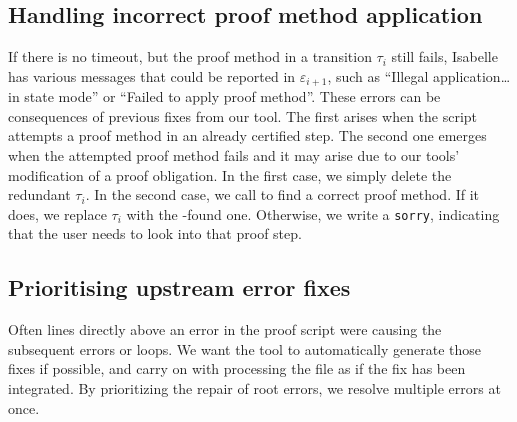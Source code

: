 \documentclass[10pt,conference]{IEEEtran}
\newcommand\CXLcache{\texttt{CXL.cache}}
\begin{document}
\subsection{Handling incorrect proof method application}
If there is no timeout, but the proof method in a transition $\tau_i$ still fails, Isabelle has various messages that could be reported in $\varepsilon_{i+1}$, such as ``Illegal application\dots in state mode'' or ``Failed to apply proof method''. These errors can be consequences of previous fixes from our tool. The first arises when the script attempts a proof method in an already certified step. The second one emerges when the attempted proof method fails and it may arise due to our tools' modification of a proof obligation. In the first case, we simply delete the redundant $\tau_i$. In the second case, we call \sledgehammer{} to find a correct proof method. If it does, we replace $\tau_i$ with the \sledgehammer{}-found one. Otherwise, we write a \texttt{sorry}, indicating that the user needs to look into that proof step.

\subsection{Prioritising upstream error fixes}

Often lines directly above an error in the proof script were causing the subsequent errors or loops. 
We want the tool to automatically generate those fixes if possible, and carry on with processing the file as if the fix has been integrated.
By prioritizing the repair of root errors, we resolve multiple errors at once.
\end{document}
